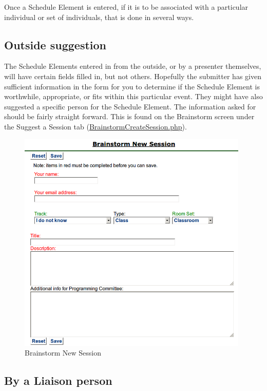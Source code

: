 \documentclass[tablesignature]{scrartcl}
\begin{document}
  Once a Schedule Element is entered, if it is to be associated with a
  particular individual or set of individuals, that is done in several
  ways.
\subsection{Outside suggestion}
\label{sec-5_1}

   
   The Schedule Elements entered in from the outside, or by a
   presenter themselves, will have certain fields filled in, but not
   others.  Hopefully the submitter has given sufficient information
   in the form for you to determine if the Schedule Element is
   worthwhile, appropriate, or fits within this particular event.
   They might have also suggested a specific person for the Schedule
   Element.  The information asked for should be fairly
   straight forward. This is found on the Brainstorm screen under the
   Suggest a Session tab (\hyperref[BrainstormCreateSession.php]{BrainstormCreateSession.php}).

\begin{figure}[H]
\centering
\includegraphics[width=0.98\textwidth]{./Images/Brainstorm_New_Session.png}
\caption{\label{fig:Zambia_Presenter_Flow_Brainstorm New Session}Brainstorm New Session}
\end{figure}
   
\subsection{By a Liaison person}
\label{sec-5_2}
\end{document}
